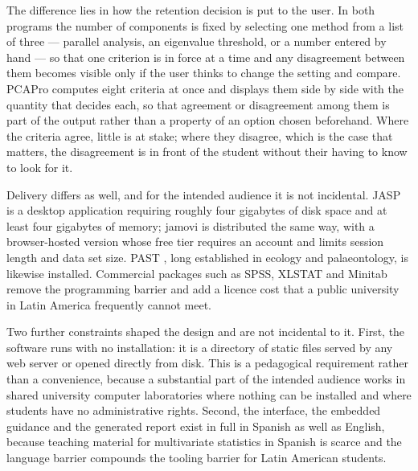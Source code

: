 \documentclass[12pt]{article}
\begin{document}
The difference lies in how the retention decision is put to the user. In both
programs the number of components is fixed by selecting one method from a list
of three --- parallel analysis, an eigenvalue threshold, or a number entered by
hand --- so that one criterion is in force at a time and any disagreement
between them becomes visible only if the user thinks to change the setting and
compare. PCAPro computes eight criteria at once and displays them side by side
with the quantity that decides each, so that agreement or disagreement among
them is part of the output rather than a property of an option chosen
beforehand. Where the criteria agree, little is at stake; where they disagree,
which is the case that matters, the disagreement is in front of the student
without their having to know to look for it.

Delivery differs as well, and for the intended audience it is not incidental.
JASP is a desktop application requiring roughly four gigabytes of disk space and
at least four gigabytes of memory; jamovi is distributed the same way, with a
browser-hosted version whose free tier requires an account and limits session
length and data set size. PAST \citep{hammer2001}, long established in ecology
and palaeontology, is likewise installed. Commercial packages such as SPSS,
XLSTAT and Minitab remove the programming barrier and add a licence cost that a
public university in Latin America frequently cannot meet.


Two further constraints shaped the design and are not incidental to it. First,
the software runs with no installation: it is a directory of static files served
by any web server or opened directly from disk. This is a pedagogical
requirement rather than a convenience, because a substantial part of the
intended audience works in shared university computer laboratories where nothing
can be installed and where students have no administrative rights. Second, the
interface, the embedded guidance and the generated report exist in full in
Spanish as well as English, because teaching material for multivariate
statistics in Spanish is scarce and the language barrier compounds the tooling
barrier for Latin American students.
\end{document}
